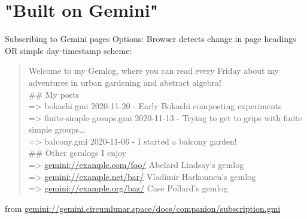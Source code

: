 \documentclass[presentation, 11pt,  aspectratio=169]{beamer}
\begin{document}
\section*{"Built on Gemini"}
\label{sec:org5daeb9f}
\begin{frame}[label={sec:orgcc90025}]{Subscribing to Gemini pages}
Options: Browser detects change in page headings OR simple day-timestamp scheme:\\
\begin{footnotesize}
\begin{quote}
Welcome to my Gemlog, where you can read every Friday about my adventures in urban gardening and abstract algebra!\\

\#\# My posts\\
=> \alert{bokashi.gmi              2020-11-20 - Early Bokashi composting experiments}\\
=> \alert{finite-simple-groups.gmi 2020-11-13 - Trying to get to grips with finite simple groups\ldots{}}\\
=> \alert{balcony.gmi              2020-11-06 - I started a balcony garden!}\\

\#\# Other gemlogs I enjoy\\
=> \href{gemini://example.com/foo/}{gemini://example.com/foo/}    Abelard Lindsay's gemlog\\
=> \href{gemini://example.net/bar/}{gemini://example.net/bar/}    Vladimir Harkonnen's gemlog\\
=> \href{gemini://example.org/baz/}{gemini://example.org/baz/}    Case Pollard's gemlog\\
\end{quote}
\end{footnotesize}
from \href{gemini://gemini.circumlunar.space/docs/companion/subscription.gmi}{gemini://gemini.circumlunar.space/docs/companion/subscription.gmi}\\
\end{frame}
\end{document}
